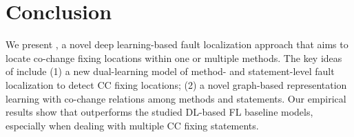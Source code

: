 \section{Conclusion}

We present {\tool}, a novel deep learning-based fault localization
approach that aims to locate co-change fixing locations within one or
multiple methods. The key ideas of {\tool} include (1) a new
dual-learning model of method- and statement-level fault localization
to detect CC fixing locations; (2) a novel graph-based representation
learning with co-change relations among methods and statements. Our
empirical results show that {\tool} outperforms the studied DL-based
FL baseline models, especially when dealing with multiple CC fixing
statements.


